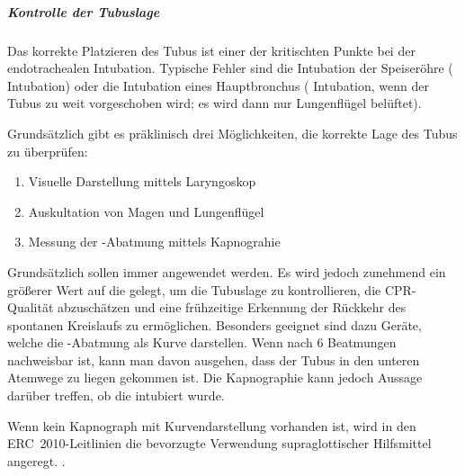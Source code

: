 \documentclass[
ngerman,
paper=a4,
asymmetric,
fontsize=10pt,
draft=false,
numbers=noenddot,
bibtotocnumbered,
footnotes=multiple,
]{scrreprt}
\newcommand{\jALTende}{\newline{\color{red}\rule{\linewidth}{2pt}\newline}}
\begin{document}
 \subparagraph{Kontrolle der Tubuslage}
 Das korrekte Platzieren des Tubus ist einer der kritischten
 Punkte bei der endotrachealen Intubation. Typische Fehler
 sind die Intubation der Speiseröhre (
 Intubation) oder die Intubation eines Hauptbronchus
 ( Intubation, wenn der Tubus zu weit
 vorgeschoben wird; es wird dann nur  Lungenflügel belüftet).
 
 Grundsätzlich gibt es präklinisch drei Möglichkeiten, die
 korrekte Lage des Tubus zu überprüfen:
 \begin{enumerate}
   \item Visuelle Darstellung mittels Laryngoskop
   \item Auskultation von Magen und Lungenflügel
   \item Messung der -Abatmung mittels Kapnograhie
 \end{enumerate}
 
  Grundsätzlich sollen immer  angewendet werden.
 Es wird jedoch zunehmend ein größerer Wert auf die
  gelegt, um die Tubuslage zu kontrollieren,
 die CPR-Qualität abzuschätzen und eine frühzeitige Erkennung
der Rückkehr des spontanen Kreislaufs zu ermöglichen.
Besonders geeignet sind dazu Geräte, welche die
-Abatmung als Kurve darstellen. Wenn nach 6
 Beatmungen  nachweisbar ist, kann man davon
 ausgehen, dass der Tubus in den unteren Atemwege zu liegen
 gekommen ist. Die Kapnographie kann jedoch  Aussage
 darüber treffen, ob die  intubiert wurde.
 
 Wenn kein Kapnograph mit Kurvendarstellung vorhanden ist,
 wird in den ERC~2010-Leitlinien die bevorzugte Verwendung
 supraglottischer Hilfsmittel
 angeregt.
.
\jALTende
\end{document}
